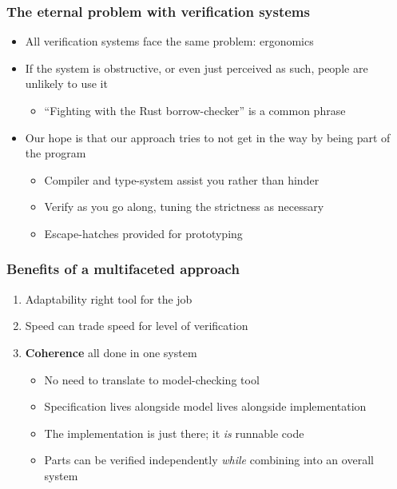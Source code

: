 \documentclass[compress,handout]{beamer}
\begin{document}
\begin{frame}
  \frametitle{The eternal problem with verification systems}

  \begin{itemize}
    \item<1-> All verification systems face the same problem: ergonomics
    \item<2-> If the system is obstructive, or even just perceived as such,
              people are unlikely to use it
    \begin{itemize}
      \item ``Fighting with the Rust borrow-checker'' is a common phrase
    \end{itemize}
    \item<3-> Our hope is that our approach tries to not get in the way by being
              part of the program
      \begin{itemize}
        \item<4-> Compiler and type-system assist you rather than hinder
        \item<5-> Verify as you go along, tuning the strictness as necessary
        \item<6-> Escape-hatches provided for prototyping
      \end{itemize}
  \end{itemize}

\end{frame}


\begin{frame}
  \frametitle{Benefits of a multifaceted approach}

  \begin{enumerate}
    \item<1-> Adaptability {\textemdash} right tool for the job
    \item<2-> Speed {\textemdash} can trade speed for level of verification
    \item<3-> \textbf{Coherence} {\textemdash} all done in one system
      \begin{itemize}
        \item<4-> No need to translate to model-checking tool
        \item<5-> Specification lives alongside model lives alongside
                  implementation
        \item<6-> The implementation is just there; it \emph{is} runnable code
        \item<7-> Parts can be verified independently \emph{while} combining into an
                  overall system
      \end{itemize}
  \end{enumerate}

\end{frame}
\end{document}
